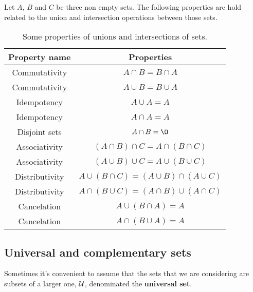 Let $A$, $B$ and $C$ be three non empty sets. The following properties are hold related to the union and intersection operations between those sets.
\newpage
\bgroup
\def\arraystretch{1.5}
\def\tabcolsep{20}
\begin{table}[h!]
\centering
\begin{tabular}{|c|c|}
    \hline
    \textbf{Property name} & \textbf{Properties} \\
    \hline
    Commutativity & $A\cap B = B\cap A$ \\
    \hline
    Commutativity & $A\cup B = B\cup A$ \\
    \hline
    Idempotency & $A\cup A = A$ \\
    \hline
    Idempotency & $A\cap A = A$ \\
    \hline
    Disjoint sets & $A\cap B = \O$ \\
    \hline
    Associativity & $\left( A\cap B \right)\cap C = A\cap\left( B\cap C \right)$ \\
    \hline
    Associativity & $\left( A\cup B \right)\cup C = A\cup\left( B\cup C \right)$ \\
    \hline
    Distributivity & $A\cup\left( B\cap C\right) = \left( A\cup B \right)\cap\left( A\cup C \right)$ \\
    \hline
    Distributivity & $A\cap\left( B\cup C\right) = \left( A\cap B \right)\cup\left( A\cap C \right)$ \\
    \hline
    Cancelation & $A\cup\left( B\cap A \right) = A$ \\
    \hline
    Cancelation & $A\cap\left( B\cup A \right) = A$ \\
    \hline
\end{tabular}
\caption{Some properties of unions and intersections of sets.}
\end{table}
\egroup

\subsection{Universal and complementary sets}
Sometimes it's convenient to assume that the sets that we are considering are subsets of a larger one, $\mathcal{U}$, denominated the \textbf{universal set}.

